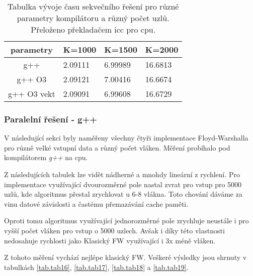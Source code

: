 \documentclass[a4paper,11pt]{article}
\begin{document}
   \begin{table}[ht]
  \begin{center}
   \begin{tabular}{|c|l|l|l|}
    \hline 
    parametry & K=1000 & K=1500 & K=2000\\
   \hline 
   \hline 
   g++ & 2.09111 & 6.99989 & 16.6813\\
   \hline
    g++ O3 & 2.09121 & 7.00416 & 16.6674\\
    \hline
    g++ O3 vekt & 2.09091 & 6.99608 & 16.6729\\
    \hline
    \end{tabular}
   \caption{Tabulka vývoje času sekvečního řešení pro různé parametry kompilátoru a různý počet uzlů. Přeloženo 
   překladačem icc pro cpu.} 
   \label{tab.tab15}
  \end{center}   
  \end{table}
  
  \subsubsection{Paralelní řešení - g++}
  V následující sekci byly naměřeny všechny čtyři implementace Floyd-Warshalla pro různě velké vstupní data a 
  různý počet vláken. Měření probíhalo pod kompilátorem \textit{g++} na cpu.
  
  Z následujících tabulek lze vidět nádherné a mnohdy lineární z rychlení. Pro implementace využívající dvourozměrné
  pole nastal zvrat pro vstup pro 5000 uzlů, kde algoritmus přestal zrychlovat u 6-8 vlákna. Toto chování 
  dáváme za vinu datové závislosti a častému přemazávání cache paměti.
  
  Oproti tomu algoritmus využívající jednorozměrné pole zrychluje neustále i pro vyšší počet vláken pro vstup o 5000 uzlech.
  Avšak i díky této vlastnosti nedosahuje rychlosti jako Klasický FW využívající i 3x méně vláken.
  
  Z tohoto měření vychází nejlépe klasický FW. Veškeré výsledky jsou shrnuty v tabulkách \ref{tab.tab16},
  \ref{tab.tab17}, \ref{tab.tab18} a \ref{tab.tab19}.
  
\end{document}
